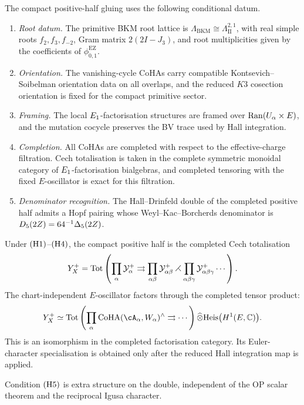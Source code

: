 The compact positive-half gluing uses the following conditional datum.
\begin{enumerate}
\item[\textup{(H1)}] \emph{Root datum.}  The primitive BKM root lattice is
  \(\Lambda_{\mathrm{BKM}}\cong\Lambda_{\mathrm{II}}^{2,1}\), with real
  simple roots \(f_2,f_3,f_{-2}\), Gram matrix \(2(2I-J_3)\), and root
  multiplicities given by the coefficients of
  \(\phi_{0,1}^{\mathrm{EZ}}\).
\item[\textup{(H2)}] \emph{Orientation.}  The vanishing-cycle CoHAs carry
  compatible Kontsevich--Soibelman orientation data on all overlaps, and
  the reduced \(K3\) cosection orientation is fixed for the compact
  primitive sector.
\item[\textup{(H3)}] \emph{Framing.}  The local \(E_{1}\)-factorisation
  structures are framed over \(\operatorname{Ran}(U_\alpha\times E)\), and the
  mutation cocycle preserves the BV trace used by Hall integration.
\item[\textup{(H4)}] \emph{Completion.}  All CoHAs are completed with
  respect to the effective-charge filtration.  Cech totalisation is
  taken in the complete symmetric monoidal category of
  \(E_{1}\)-factorisation bialgebras, and completed tensoring with the
  fixed \(E\)-oscillator is exact for this filtration.
\item[\textup{(H5)}] \emph{Denominator recognition.}  The
  Hall--Drinfeld double of the completed positive half admits a Hopf
  pairing whose Weyl--Kac--Borcherds denominator is
  \(D_{5}(2Z)=64^{-1}\Delta_{5}(2Z)\).
\end{enumerate}

Under \(\textup{(H1)}\)--\(\textup{(H4)}\), the compact positive half is
the completed Cech totalisation
\[
  Y^{+}_X
  =
  \operatorname{Tot}\left(
  \prod_\alpha \mathcal Y_\alpha^{+}
  \rightrightarrows
  \prod_{\alpha\beta}\mathcal Y_{\alpha\beta}^{+}
  \rightthreetimes
  \prod_{\alpha\beta\gamma}\mathcal Y_{\alpha\beta\gamma}^{+}
  \cdots
  \right).
\]
The chart-independent \(E\)-oscillator factors through the completed
tensor product:
\[
  \Ypos_X
  \simeq
  \Tot\left(\prod_\alpha
    \CoHA(\cA_\alpha,W_\alpha)^{\wedge}\rightrightarrows\cdots
  \right)
  \widehat\otimes
  \Heis\bigl(H^1(E,\mathbb C)\bigr).
\]
This is an isomorphism in the completed factorisation category.  Its
Euler-character specialisation is obtained only after the reduced Hall
integration map is applied.

Condition \(\textup{(H5)}\) is extra structure on the double, independent
of the OP scalar theorem and the reciprocal Igusa character.

